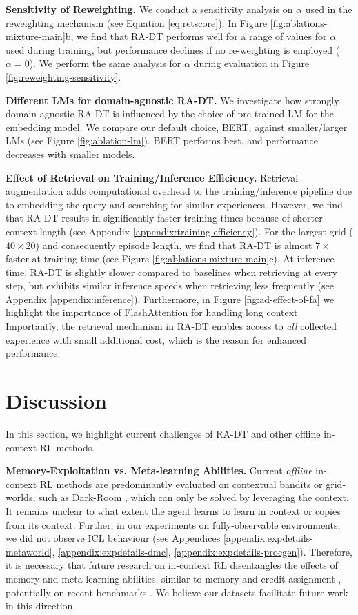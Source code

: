 \documentclass{article} %
\begin{document}
\textbf{Sensitivity of Reweighting.} We conduct a sensitivity analysis on $\alpha$ used in the reweighting mechanism (see Equation \ref{eq:retscore}).
In Figure \ref{fig:ablations-mixture-main}b, we find that RA-DT performs well for a range of values for $\alpha$ used during training, but performance declines if no re-weighting is employed ($\alpha=0$).
We perform the same analysis for $\alpha$ during evaluation in Figure \ref{fig:reweighting-sensitivity}.


\textbf{Different LMs for domain-agnostic RA-DT.}
We investigate how strongly domain-agnostic RA-DT is influenced by the choice of pre-trained LM for the embedding model. 
We compare our default choice, BERT, against smaller/larger LMs (see Figure \ref{fig:ablation-lm}).
BERT performs best, and performance decreases with smaller models.

\textbf{Effect of Retrieval on Training/Inference Efficiency.}
Retrieval-augmentation adds computational overhead to the training/inference pipeline due to embedding the query and searching for similar experiences. 
However, we find that RA-DT results in significantly faster training times because of shorter context length (see Appendix \ref{appendix:training-efficiency}).
For the largest grid ($40\times20$) and consequently episode length, we find that RA-DT is almost $7\times$ faster at training time (see Figure \ref{fig:ablations-mixture-main}c).
At inference time, RA-DT is slightly slower compared to baselines when retrieving at every step, but exhibits similar inference speeds when retrieving less frequently (see Appendix \ref{appendix:inference}).
Furthermore, in Figure \ref{fig:ad-effect-of-fa} we highlight the importance of FlashAttention \citep{Dao:23} for handling long context.
Importantly, the retrieval mechanism in RA-DT enables access to \emph{all} collected experience with small additional cost, which is the reason for enhanced performance. 




\section{Discussion}\label{sec:discussion}
In this section, we highlight current challenges of RA-DT and other offline in-context RL methods. 

\textbf{Memory-Exploitation vs. Meta-learning Abilities.} 
Current \emph{offline} in-context RL methods are predominantly evaluated on contextual bandits or grid-worlds, such as Dark-Room \citep{Laskin:22,Lee:23,Lin:23,zisman2023emergence,Sinii:23,huang2024context}, which can only be solved by leveraging the context.
It remains unclear to what extent the agent learns to learn in context or copies from its context.
Further, in our experiments on fully-observable environments, we did not observe ICL behaviour (see Appendices \ref{appendix:expdetails-metaworld}, \ref{appendix:expdetails-dmc}, \ref{appendix:expdetails-procgen}).
Therefore, it is necessary that future research on in-context RL disentangles the effects of memory and meta-learning abilities, similar to memory and credit-assignment \citep{Ni:24}, potentially on recent benchmarks \citep{nikulin2023xland,nikulin2024xland}. %
We believe our datasets facilitate future work in this direction. 
\end{document}
